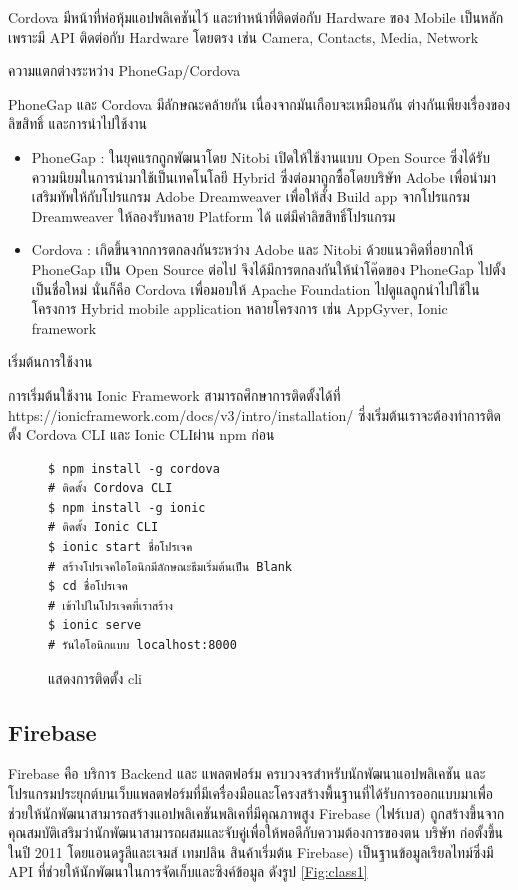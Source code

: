 		Cordova มีหน้าที่ห่อหุ้มแอปพลิเคชันไว้ และทำหน้าที่ติดต่อกับ Hardware ของ Mobile เป็นหลักเพราะมี API ติดต่อกับ Hardware โดยตรง เช่น Camera, Contacts, Media, Network
		
		ความแตกต่างระหว่าง PhoneGap/Cordova

		PhoneGap และ Cordova มีลักษณะคล้ายกัน เนื่องจากมันเกือบจะเหมือนกัน ต่างกันเพียงเรื่องของลิขสิทธิ์ และการนำไปใช้งาน
		\begin{itemize}
		\item PhoneGap : ในยุคแรกถูกพัฒนาโดย Nitobi เปิดให้ใช้งานแบบ Open Source ซึ่งได้รับความนิยมในการนำมาใช้เป็นเทคโนโลยี Hybrid ซึ่งต่อมาถูกซื้อโดยบริษัท Adobe เพื่อนำมาเสริมทัพให้กับโปรแกรม Adobe Dreamweaver เพื่อให้สั่ง Build app จากโปรแกรม Dreamweaver ให้ลองรับหลาย Platform ได้ แต่มีค่าลิขสิทธิ์โปรแกรม
		\item Cordova : เกิดขึ้นจากการตกลงกันระหว่าง Adobe และ Nitobi ด้วยแนวคิดที่อยากให้ PhoneGap เป็น Open Source ต่อไป จึงได้มีการตกลงกันให้นำโค๊ดของ PhoneGap ไปตั้งเป็นชื่อใหม่ นั่นก็คือ Cordova เพื่อมอบให้ Apache Foundation ไปดูแลถูกนำไปใช้ในโครงการ Hybrid mobile application หลายโครงการ เช่น AppGyver, Ionic framework
		\end{itemize}

		เริ่มต้นการใช้งาน

		การเริ่มต้นใช้งาน Ionic Framework สามารถศึกษาการติดตั้งได้ที่ https://ionicframework.com/docs/v3/intro/installation/ ซี่งเริ่มต้นเราจะต้องทำการติดตั้ง Cordova CLI และ Ionic CLIผ่าน npm ก่อน
		\begin{figure}[H]
			{\begin{lstlisting}
$ npm install -g cordova 
# ติดตั้ง Cordova CLI
$ npm install -g ionic 
# ติดตั้ง Ionic CLI
$ ionic start ชื่อโปรเจค
# สร้างโปรเจคไอโอนิกมีลักษณะธีมเริ่มต้นเป็น Blank
$ cd ชื่อโปรเจค
# เข้าไปในโปรเจคที่เราสร้าง
$ ionic serve
# รันไอโอนิกแบบ localhost:8000
				\end{lstlisting}}
			\centering
			\caption{แสดงการติดตั้ง cli}
			\label{Fig:moment}
		\end{figure}
		


	\subsection{Firebase}
	Firebase \cite{firebase} คือ บริการ Backend และ แพลตฟอร์ม ครบวงจรสำหรับนักพัฒนาแอปพลิเคชัน และโปรแกรมประยุกต์บนเว็บแพลตฟอร์มที่มีเครื่องมือและโครงสร้างพื้นฐานที่ได้รับการออกแบบมาเพื่อช่วยให้นักพัฒนาสามารถสร้างแอปพลิเคชันพลิเคที่มีคุณภาพสูง Firebase (ไฟร์เบส) ถูกสร้างขึ้นจากคุณสมบัติเสริมว่านักพัฒนาสามารถผสมและจับคู่เพื่อให้พอดีกับความต้องการของตน บริษัท ก่อตั้งขึ้นในปี 2011 โดยแอนดรูลีและเจมส์ เทมปลิน สินค้าเริ่มต้น Firebase) เป็นฐานข้อมูลเรียลไทม์ซึ่งมี API ที่ช่วยให้นักพัฒนาในการจัดเก็บและซิงค์ข้อมูล ดังรูป \ref{Fig:class1}
	
